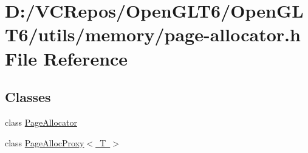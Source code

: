 \hypertarget{page-allocator_8h}{}\section{D\+:/\+V\+C\+Repos/\+Open\+G\+L\+T6/\+Open\+G\+L\+T6/utils/memory/page-\/allocator.h File Reference}
\label{page-allocator_8h}
\subsection*{Classes}
\begin{DoxyCompactItemize}
\item 
class \mbox{\hyperlink{class_page_allocator}{Page\+Allocator}}
\item 
class \mbox{\hyperlink{class_page_alloc_proxy}{Page\+Alloc\+Proxy$<$ T $>$}}
\end{DoxyCompactItemize}
